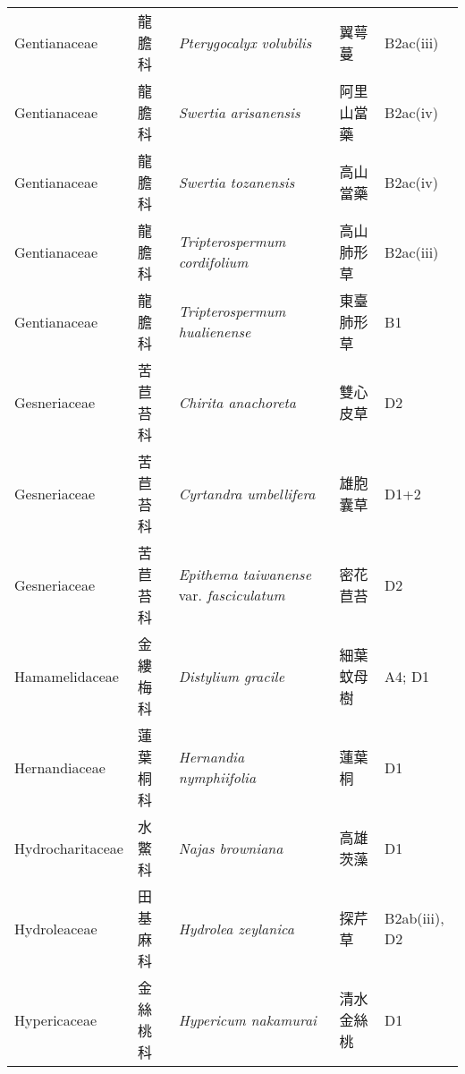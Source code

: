 {\begin{longtable}{p{2.5cm}p{2.5cm}p{4.5cm}p{2.5cm}p{3cm}}
    Gentianaceae & 龍膽科 & \textit{Pterygocalyx volubilis}  & 翼萼蔓 & B2ac(iii) \index{Pterygocalyx@\textit{Pterygocalyx}!volubilis@\textit{volubilis}}  \index{翼萼蔓} \\
    Gentianaceae & 龍膽科 & \textit{Swertia arisanensis}  & 阿里山當藥 & B2ac(iv) \index{Swertia@\textit{Swertia}!arisanensis@\textit{arisanensis}}  \index{阿里山當藥} \\
    Gentianaceae & 龍膽科 & \textit{Swertia tozanensis}  & 高山當藥 & B2ac(iv) \index{Swertia@\textit{Swertia}!tozanensis@\textit{tozanensis}}  \index{高山當藥} \\
    Gentianaceae & 龍膽科 & \textit{Tripterospermum cordifolium}  & 高山肺形草 & B2ac(iii) \index{Tripterospermum@\textit{Tripterospermum}!cordifolium@\textit{cordifolium}}  \index{高山肺形草} \\
    Gentianaceae & 龍膽科 & \textit{Tripterospermum hualienense}  & 東臺肺形草 & B1 \index{Tripterospermum@\textit{Tripterospermum}!hualienense@\textit{hualienense}}  \index{東臺肺形草} \\
    Gesneriaceae & 苦苣苔科 & \textit{Chirita anachoreta}  & 雙心皮草 & D2 \index{Chirita@\textit{Chirita}!anachoreta@\textit{anachoreta}}  \index{雙心皮草} \\
    Gesneriaceae & 苦苣苔科 & \textit{Cyrtandra umbellifera}  & 雄胞囊草 & D1+2 \index{Cyrtandra@\textit{Cyrtandra}!umbellifera@\textit{umbellifera}}  \index{雄胞囊草} \\
    Gesneriaceae & 苦苣苔科 & \textit{Epithema taiwanense} var. \textit{fasciculatum}  & 密花苣苔 & D2 \index{Epithema@\textit{Epithema}!taiwanense@\textit{taiwanense}!var. fasciculatum@var. \textit{fasciculatum}}  \index{密花苣苔} \\
    Hamamelidaceae & 金縷梅科 & \textit{Distylium gracile}  & 細葉蚊母樹 & A4; D1 \index{Distylium@\textit{Distylium}!gracile@\textit{gracile}}  \index{細葉蚊母樹} \\
    Hernandiaceae & 蓮葉桐科 & \textit{Hernandia nymphiifolia}  & 蓮葉桐 & D1 \index{Hernandia@\textit{Hernandia}!nymphiifolia@\textit{nymphiifolia}}  \index{蓮葉桐} \\
    Hydrocharitaceae & 水鱉科 & \textit{Najas browniana}  & 高雄茨藻 & D1 \index{Najas@\textit{Najas}!browniana@\textit{browniana}}  \index{高雄茨藻} \\
    Hydroleaceae & 田基麻科 & \textit{Hydrolea zeylanica}  & 探芹草 & B2ab(iii), D2 \index{Hydrolea@\textit{Hydrolea}!zeylanica@\textit{zeylanica}}  \index{探芹草} \\
    Hypericaceae & 金絲桃科 & \textit{Hypericum nakamurai}  & 清水金絲桃 & D1 \index{Hypericum@\textit{Hypericum}!nakamurai@\textit{nakamurai}}  \index{清水金絲桃} \\

\end{longtable}}
